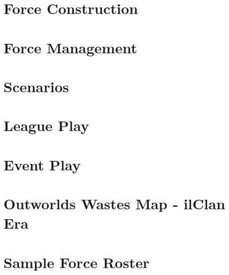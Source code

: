 \documentclass{article}
\newcommand{\mysectiontitle}{}
\newcommand{\newsection}[2]{\renewcommand{\mysectiontitle}{#2}\section{#1}}
\begin{document}


\newsection{Force Construction}{force-construction}



\newpage

\newsection{Force Management}{force-management}



\newpage

\newsection{Scenarios}{scenarios}



\newpage

\newsection{League Play}{league-play}



\newpage

\newsection{Event Play}{event-play}



\newpage

\newsection{Outworlds Wastes Map - ilClan Era}{outworlds-wastes-map}



\newpage

\newsection{Sample Force Roster}{sample-force-roster}


\end{document}
